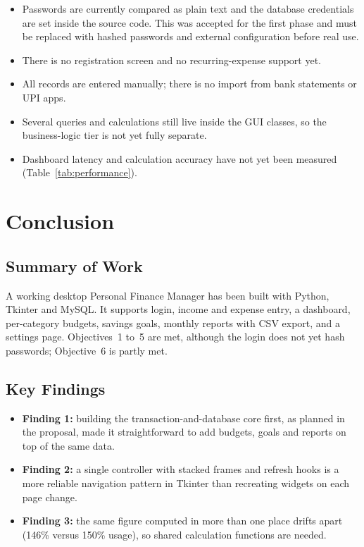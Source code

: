 \documentclass{tietreport}
\begin{document}
\begin{itemize}
  \item Passwords are currently compared as plain text and the
    database credentials are set inside the source code. This was
    accepted for the first phase and must be replaced with hashed
    passwords and external configuration before real use.
  \item There is no registration screen and no recurring-expense
    support yet.
  \item All records are entered manually; there is no import from
    bank statements or UPI apps.
  \item Several queries and calculations still live inside the GUI
    classes, so the business-logic tier is not yet fully separate.
  \item Dashboard latency and calculation accuracy have not yet been
    measured (Table~\ref{tab:performance}).
\end{itemize}


\chapter{Conclusion}

\section{Summary of Work}

A working desktop Personal Finance Manager has been built with
Python, Tkinter and MySQL. It supports login, income and expense
entry, a dashboard, per-category budgets, savings goals, monthly
reports with CSV export, and a settings page. Objectives~1 to~5
are met, although the login does not yet hash passwords;
Objective~6 is partly met.

\section{Key Findings}

\begin{itemize}
  \item \textbf{Finding 1:} building the transaction-and-database
    core first, as planned in the proposal, made it straightforward
    to add budgets, goals and reports on top of the same data.
  \item \textbf{Finding 2:} a single controller with stacked frames
    and refresh hooks is a more reliable navigation pattern in
    Tkinter than recreating widgets on each page change.
  \item \textbf{Finding 3:} the same figure computed in more than
    one place drifts apart (146\% versus 150\% usage), so shared
    calculation functions are needed.
\end{itemize}
\end{document}

